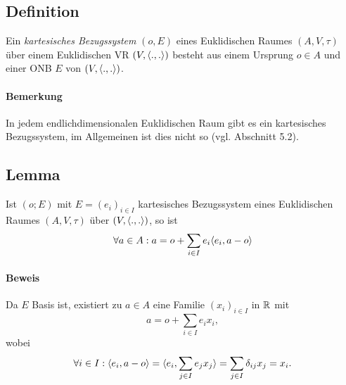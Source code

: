 \subsection{Definition}
	Ein \emph{kartesisches Bezugssystem} $ (o,E) $ eines Euklidischen Raumes $ (A,V,\tau) $ über einem Euklidischen VR $ (V,\langle .,. \rangle) $ besteht aus einem Ursprung $ o\in A $ und einer ONB $ E $ von $ (V,\langle .,. \rangle) $.
\paragraph{Bemerkung}
	In jedem endlichdimensionalen Euklidischen Raum gibt es ein kartesisches Bezugssystem, im Allgemeinen ist dies nicht so (vgl. Abschnitt 5.2).
	
\subsection{Lemma}
	Ist $ (o;E) $ mit $ E=(e_i)_{i\in I} $ kartesisches Bezugssystem eines Euklidischen Raumes $ (A,V,\tau) $ über $ (V,\langle .,. \rangle) $, so ist 
		\[ \forall a\in A: a = o + \sum_{i\in I} e_i \langle e_i,a-o \rangle \]
\paragraph{Beweis}
	Da $ E $ Basis ist, existiert zu $ a\in A $ eine Familie $ (x_i)_{i\in I} $ in $ \mathbb{R} $ mit
		\[ a = o + \sum_{i\in I}e_ix_i, \]
	wobei
		\[ \forall i\in I: \langle e_i,a-o \rangle = \langle e_i,\sum_{j\in I}e_jx_j \rangle = \sum_{j\in I}\delta_{ij}x_j = x_i. \]
